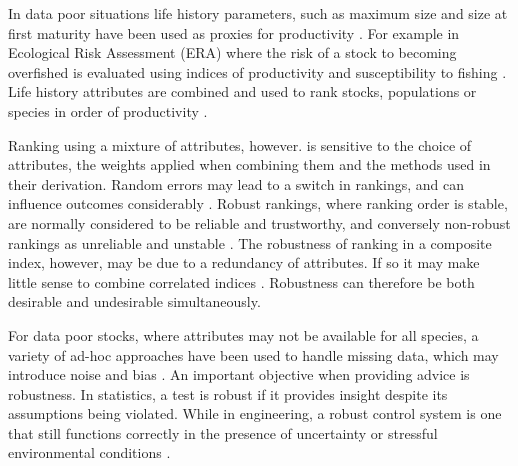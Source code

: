 \documentclass[12pt,doublespacing,a4paper]{ouparticle}
\begin{document}
In data poor situations life history parameters, such as maximum size and size at first maturity have been used as proxies for productivity \citep{roff1984evolution,jensen1996beverton,caddy1998short,reynolds2001life,denney2002life}. For example in Ecological Risk Assessment (ERA) %
where the risk of a stock to becoming overfished is evaluated using indices of productivity and susceptibility to fishing \citep{hobday2011ecological}. Life history attributes are combined and used to rank stocks, populations or species in order of productivity \citep[e.g.][]{cortes2010ecological,arrizabalaga2011productivity}. %

Ranking using a mixture of attributes, however. is sensitive to the choice of attributes, the weights applied when combining them and the methods used in their derivation. Random errors may lead to a switch in rankings, and can influence outcomes considerably \citep{freyer2014robust}. Robust rankings, where ranking order is stable, are normally considered to be reliable and trustworthy, and conversely non-robust rankings as unreliable and unstable \citep{permanyer2011assessing}. The robustness of ranking in a composite index, however, may be due to a redundancy of attributes. If so it may make little sense to combine correlated indices \citep{mcgillivray1991human}. Robustness can therefore be both desirable and undesirable simultaneously. 

For data poor stocks, where attributes may not be available for all species, a variety of ad-hoc approaches have been used to handle missing data, which may introduce noise and bias \citep{schafer2002missing}. An important objective when providing advice is robustness. In statistics, a test is robust if it provides insight despite its assumptions being violated. While in engineering, a robust control system is one that still functions correctly in the presence of uncertainty or stressful environmental conditions \citep{radatz1990ieee}. %
\end{document}
